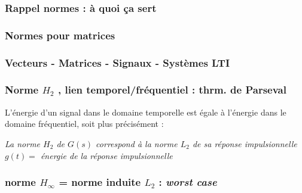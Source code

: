 \documentclass[document.tex]{subfiles}
\begin{document}

\subsubsection{Rappel normes : à quoi ça sert}

\subsubsection{Normes pour matrices}

\subsubsection{Vecteurs - Matrices - Signaux - Systèmes LTI}

\subsubsection{Norme $H_2$ , lien temporel/fréquentiel : thrm. de Parseval}

L'énergie d'un signal dans le domaine temporelle est égale à l'énergie dans le domaine fréquentiel, soit plus précisément :

\begin{center}
\textit{La norme $H_2$ de $G(s)$ correspond à la norme $L_2$ de sa réponse impulsionnelle $g(t) =$ énergie de la réponse impulsionnelle}
\end{center}

\subsubsection{norme $H_\infty$ = norme induite $L_2$ : \textit{worst case}}
\end{document}
